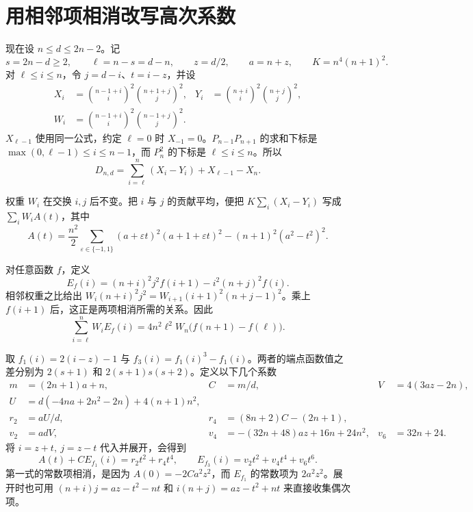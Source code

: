 \documentclass[11pt,UTF8,fontset=fandol,scheme=plain]{ctexart}
\newcommand{\Dx}{D_{n,d}}
\newcommand{\ellbound}{\ell}
\begin{document}
\clearpage
\section{用相邻项相消改写高次系数}

现在设 \(n\le d\le2n-2\)。记
\[
  s=2n-d\ge2,\qquad \ellbound=n-s=d-n,\qquad z=d/2,
  \qquad a=n+z,\qquad K=n^4(n+1)^2.
\]
对 \(\ellbound\le i\le n\)，令 \(j=d-i\)、\(t=i-z\)，并设
\begin{align*}
  X_i&=\binom{n-1+i}{i}^{\!2}\binom{n+1+j}{j}^{\!2}, &
  Y_i&=\binom{n+i}{i}^{\!2}\binom{n+j}{j}^{\!2},\\
  W_i&=\binom{n-1+i}{i}^{\!2}\binom{n-1+j}{j}^{\!2}.
\end{align*}
\(X_{\ellbound-1}\) 使用同一公式，约定 \(\ellbound=0\) 时 \(X_{-1}=0\)。\(P_{n-1}P_{n+1}\) 的求和下标是 \(\max(0,\ellbound-1)\le i\le n-1\)，而 \(P_n^2\) 的下标是 \(\ellbound\le i\le n\)。所以
\begin{equation}
  \Dx=\sum_{i=\ellbound}^{n}(X_i-Y_i)+X_{\ellbound-1}-X_n.
  \label{eq:split}
\end{equation}

权重 \(W_i\) 在交换 \(i,j\) 后不变。把 \(i\) 与 \(j\) 的贡献平均，便把 \(K\sum_i(X_i-Y_i)\) 写成 \(\sum_i W_i A(t)\)，其中
\[
 A(t)=\frac{n^2}{2}\sum_{\varepsilon\in\{-1,1\}}
   (a+\varepsilon t)^2(a+1+\varepsilon t)^2
   -(n+1)^2(a^2-t^2)^2.
\]

对任意函数 \(f\)，定义
\[
  E_f(i)=(n+i)^2j^2 f(i+1)-i^2(n+j)^2 f(i).
\]
相邻权重之比给出 \(W_i(n+i)^2j^2=W_{i+1}(i+1)^2(n+j-1)^2\)。乘上 \(f(i+1)\) 后，这正是两项相消所需的关系。因此
\begin{equation}
 \sum_{i=\ellbound}^{n}W_i E_f(i)
 =4n^2\ellbound^2W_n\bigl(f(n+1)-f(\ellbound)\bigr).
 \label{eq:telescoping}
\end{equation}

取 \(f_1(i)=2(i-z)-1\) 与 \(f_3(i)=f_1(i)^3-f_1(i)\)。两者的端点函数值之差分别为 \(2(s+1)\) 和 \(2(s+1)s(s+2)\)。定义以下几个系数
\begin{align*}
 m&=(2n+1)a+n, & C&=m/d, & V&=4(3az-2n),\\
 U&=d(-4na+2n^2-2n)+4(n+1)n^2,\\[-2pt]
 r_2&=aU/d, & r_4&=(8n+2)C-(2n+1),\\
 v_2&=adV, & v_4&=-(32n+48)az+16n+24n^2, & v_6&=32n+24.
\end{align*}
将 \(i=z+t,\ j=z-t\) 代入并展开，会得到
\begin{equation}
  A(t)+C E_{f_1}(i)=r_2t^2+r_4t^4,
  \qquad E_{f_3}(i)=v_2t^2+v_4t^4+v_6t^6.
  \label{eq:expand}
\end{equation}
第一式的常数项相消，是因为 \(A(0)=-2Ca^2z^2\)，而 \(E_{f_1}\) 的常数项为 \(2a^2z^2\)。展开时也可用 \((n+i)j=az-t^2-nt\) 和 \(i(n+j)=az-t^2+nt\) 来直接收集偶次项。
\end{document}
